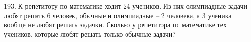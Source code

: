193.  К репетитору по математике ходит 24 учеников. Из них олимпиадные задачи любят решать 6 человек, обычные и олимпиадные – 2 человека, а 3 ученика вообще не любят решать задачки. Сколько у репетитора по математике тех учеников, которые любят решать только обычные задачи?\\
